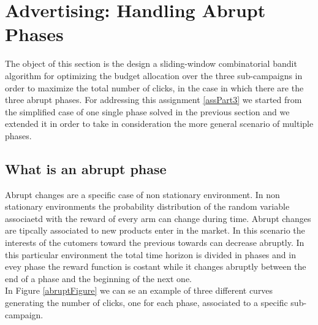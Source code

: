 \chapter{Advertising: Handling Abrupt Phases}

The object of this section is the design a sliding-window combinatorial bandit algorithm for optimizing the budget allocation over the three sub-campaigns in order to maximize the total number of clicks, in the case in which there are the three abrupt phases.
For addressing this assignment \ref{assPart3} we started from the simplified case of one single phase solved in the previous section and we extended it in order to take in consideration the more general scenario of multiple phases.\\

\section{What is an abrupt phase}
Abrupt changes are a specific case of non stationary environment.
In non stationary environments the probability distribution of the random variable associaetd with the reward of every arm can change during time.
Abrupt changes are tipcally associated to new products enter in the market. In this scenario the interests of the cutomers toward the previous towards can decrease abruptly.
In this particular environment the total time horizon is divided in phases and in evey phase the reward function is costant while it changes abruptly between the end of a phase and the beginning of the next one.\\ In Figure \ref{abruptFigure} we can se an example of three different curves generating  the number of clicks, one for each phase, associated to a specific sub-campaign.
